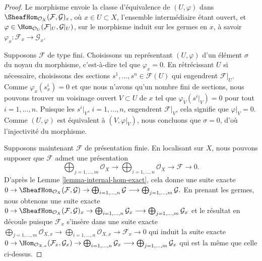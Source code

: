 \begin{proof}
Le morphisme envoie la classe d'équivalence de
$(U, \varphi)$ dans $\SheafHom_{\mathcal{O}_X}(\mathcal{F}, \mathcal{G})_x$,
où $x \in U \subset X$, l'ensemble intermédiaire étant ouvert, et
$\varphi \in \Hom_{\mathcal{O}_U}(\mathcal{F}|_U, \mathcal{G}|_U)$,
sur le morphisme induit sur les germes en $x$, à savoir
$\varphi_x : \mathcal{F}_x \to \mathcal{G}_x$.

\medskip\noindent
Supposons $\mathcal{F}$ de type fini.
Choisissons un représentant $(U, \varphi)$ d'un élément $\sigma$
du noyau du morphisme, c'est-à-dire tel que $\varphi_x = 0$.
En rétrécissant $U$ si nécessaire, choisissons des sections
$s^1, \ldots, s^n \in \mathcal{F}(U)$ qui engendrent $\mathcal{F}|_U$.
Comme $\varphi_x(s^i_x) = 0$
et que nous n'avons qu'un nombre fini de sections,
nous pouvons trouver un voisinage ouvert
$V \subset U$ de $x$ tel que $\varphi_V(s^i|_V)=0$
pour tout $i = 1, \ldots, n$. Puisque les $s^i|_V$, $i = 1, \ldots, n$, engendrent
$\mathcal{F}|_V$, cela signifie que $\varphi|_V = 0$.
Comme $(U, \varphi)$ est équivalent à $(V, \varphi|_V)$,
nous concluons que $\sigma = 0$, d'où l'injectivité du morphisme.

\medskip\noindent
Supposons maintenant $\mathcal{F}$ de présentation finie.
En localisant sur $X$, nous pouvons supposer que $\mathcal{F}$ admet une présentation
$$
\bigoplus\nolimits_{j = 1, \ldots, m}
\mathcal{O}_X
\longrightarrow
\bigoplus\nolimits_{i = 1, \ldots, n}
\mathcal{O}_X
\to
\mathcal{F}
\to
0.
$$
D'après le Lemme \ref{lemma-internal-hom-exact}, cela donne une suite exacte
$
0 \to
\SheafHom_{\mathcal{O}_X}(\mathcal{F}, \mathcal{G}) \to
\bigoplus\nolimits_{i = 1, \ldots, n} \mathcal{G}
\longrightarrow
\bigoplus\nolimits_{j = 1, \ldots, m} \mathcal{G}.
$
En prenant les germes, nous obtenons une suite exacte
$
0 \to
\SheafHom_{\mathcal{O}_X}(\mathcal{F}, \mathcal{G})_x \to
\bigoplus\nolimits_{i = 1, \ldots, n} \mathcal{G}_x
\longrightarrow
\bigoplus\nolimits_{j = 1, \ldots, m} \mathcal{G}_x
$
et le résultat en découle puisque $\mathcal{F}_x$ s'insère dans
une suite exacte
$
\bigoplus\nolimits_{j = 1, \ldots, m}
\mathcal{O}_{X, x}
\longrightarrow
\bigoplus\nolimits_{i = 1, \ldots, n}
\mathcal{O}_{X, x}
\to
\mathcal{F}_x
\to
0
$
qui induit la suite exacte
$
0 \to
\Hom_{\mathcal{O}_{X, x}}(\mathcal{F}_x, \mathcal{G}_x) \to
\bigoplus\nolimits_{i = 1, \ldots, n} \mathcal{G}_x
\longrightarrow
\bigoplus\nolimits_{j = 1, \ldots, m} \mathcal{G}_x
$
qui est la même que celle ci-dessus.
\end{proof}


